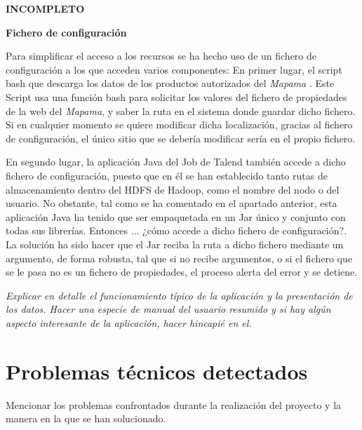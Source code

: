 \textbf{INCOMPLETO}

\bigskip
\par 
\textbf{Fichero de configuración}
\par
Para simplificar el acceso a los recursos se ha hecho uso de un fichero de configuración a los que acceden varios componentes: En primer lugar, el script bash que descarga los datos de los productos autorizados del \textit{Mapama} \cite{mapama}. Este Script usa una función bash para solicitar los valores del fichero de propiedades de la web del \textit{Mapama}, y saber la ruta en el sistema donde guardar dicho fichero. Si en cualquier momento se quiere modificar dicha localización, gracias al fichero de configuración, el único sitio que se debería modificar sería en el propio fichero. 
\par En segundo lugar, la aplicación Java del Job de Talend también accede a dicho fichero de configuración, puesto que en él se han establecido tanto rutas de almacenamiento dentro del HDFS de Hadoop, como el nombre del nodo o del usuario. No obstante, tal como se ha comentado en el apartado anterior, esta aplicación Java ha tenido que ser empaquetada en un Jar único y conjunto con todas sus librerías. Entonces ... ¿cómo accede a dicho fichero de configuración?. La solución ha sido hacer que el Jar reciba la ruta a dicho fichero mediante un argumento, de forma robusta, tal que si no recibe argumentos, o si el fichero que se le pasa no es un fichero de propiedades, el proceso alerta del error y se detiene. 
\bigskip
\par
\textit{Explicar en detalle el funcionamiento típico de la aplicación y la presentación de los datos. Hacer una especie de manual del usuario resumido y si hay algún aspecto interesante de la aplicación, hacer hincapié en el.}
\section{Problemas técnicos detectados}
Mencionar los problemas confrontados durante la realización del proyecto y la manera en la que se han solucionado.
